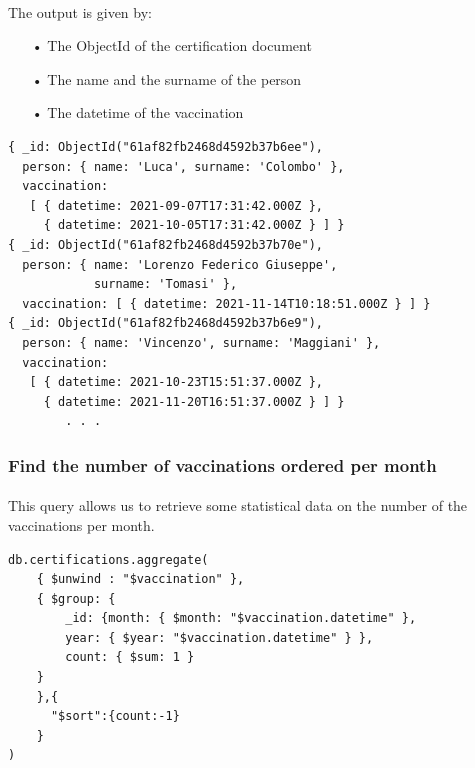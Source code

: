 \documentclass[a4paper,12pt]{article}
\begin{document}
\paragraph{} The output is given by: 
\begin{itemize}[noitemsep]
\item[•] The ObjectId of the certification document
\item[•] The name and the surname of the person 
\item[•] The datetime of the vaccination
\end{itemize}
\begin{tcolorbox}[colback=red!5!white,colframe=red!75!black,title=OUTPUT]
\begin{verbatim}
{ _id: ObjectId("61af82fb2468d4592b37b6ee"),
  person: { name: 'Luca', surname: 'Colombo' },
  vaccination: 
   [ { datetime: 2021-09-07T17:31:42.000Z },
     { datetime: 2021-10-05T17:31:42.000Z } ] }
{ _id: ObjectId("61af82fb2468d4592b37b70e"),
  person: { name: 'Lorenzo Federico Giuseppe', 
            surname: 'Tomasi' },
  vaccination: [ { datetime: 2021-11-14T10:18:51.000Z } ] }
{ _id: ObjectId("61af82fb2468d4592b37b6e9"),
  person: { name: 'Vincenzo', surname: 'Maggiani' },
  vaccination: 
   [ { datetime: 2021-10-23T15:51:37.000Z },
     { datetime: 2021-11-20T16:51:37.000Z } ] }
        . . .
\end{verbatim}
\end{tcolorbox}
\clearpage
\subsubsection{Find the number of vaccinations ordered per month}
\paragraph{} This query allows us to retrieve some statistical data on the number of the vaccinations per month.
\begin{tcolorbox}[colback=green!5!white,colframe=green!75!black,title=QUERY]
\begin{verbatim}
db.certifications.aggregate(
    { $unwind : "$vaccination" }, 
    { $group: {
        _id: {month: { $month: "$vaccination.datetime" },
        year: { $year: "$vaccination.datetime" } },
        count: { $sum: 1 }
    }
    },{
      "$sort":{count:-1}
    }
)
\end{verbatim}
\end{tcolorbox}
\end{document}
